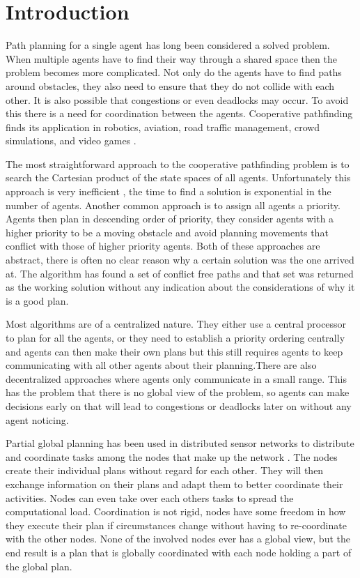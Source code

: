\section{Introduction}\label{sec:intro}
Path planning for a single agent has long been considered a solved problem.
When multiple agents have to find their way through a shared space then the
problem becomes more complicated. Not only do the agents have to find paths
around obstacles, they also need to ensure that they do not collide with each
other. It is also possible that congestions or even deadlocks may occur. To
avoid this there is a need for coordination between the agents.
Cooperative pathfinding finds its application in robotics, aviation, road
traffic management, crowd simulations, and video games \cite{standley2011}.

The most straightforward approach to the cooperative pathfinding problem is to
search the Cartesian product of the state spaces of all agents. Unfortunately
this approach is very inefficient \cite{sharon2013}, the time to find a
solution is exponential
in the number of agents. Another common approach is to assign all agents a
priority. Agents then plan in descending order of priority, they consider
agents with a higher priority to be a moving obstacle and avoid planning
movements that conflict with those of higher priority agents. Both of these
approaches are abstract, there is often no clear reason why a certain solution
was the one arrived at. The algorithm has found a set of conflict free paths
and that set was returned as the working solution without any indication about
the considerations of why it is a good plan.

Most algorithms are of a centralized nature. They either use a central
processor to plan for all the agents, or they need to establish a priority
ordering centrally and agents can then make their own plans but this still
requires agents to keep communicating with all other agents about their
planning.There are also decentralized approaches where agents only communicate
in a small range. This has the problem that there is no global view of the
problem, so agents can make decisions early on that will lead to congestions or
deadlocks later on without any agent noticing.

Partial global planning has been used in distributed sensor networks to
distribute and coordinate tasks among the nodes that make up the network
\cite{durfee1991}. The nodes create their individual plans without regard for
each other. They will then exchange information on their plans and adapt them
to better coordinate their activities. Nodes can even take over each others
tasks to spread the computational load. Coordination is not rigid, nodes have
some freedom in how they execute their plan if circumstances change without
having to re-coordinate with the other nodes. None of the involved nodes ever
has a global view, but the end result is a plan that is globally coordinated
with each node holding a part of the global plan.

